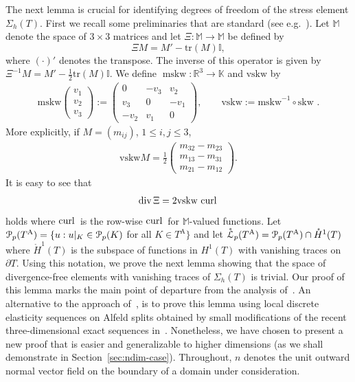 \documentclass[12pt]{amsart}
\numberwithin{equation}{section}
\theoremstyle{definition}
\theoremstyle{remark}
\newcommand{\M}{\mathbb{M}}
\newcommand{\K}{\mathbb{K}}
\renewcommand{\(}{\bigl(}
\renewcommand{\)}{\bigr)}
\newcommand{\curl}{{\ensuremath\mathop{\mathrm{curl}\,}}}
\newcommand{\grad}{{\ensuremath\mathop{\mathrm{ grad}\,}}}
\newcommand{\dive}{{\ensuremath\mathop{\mathrm{div}\,}}} %
\newcommand{\pol}{\EuScript{P}}
\newcommand{\Ta}{T^{\text{A}}}
\newcommand{\LLo}{\mathring{\mathcal{L}}}
\newcommand\mskw{\operatorname{mskw}}
\newcommand{\revj}[1]{{\color{black}#1}}
\begin{document}
The next lemma is crucial for identifying degrees of freedom of the stress element  $\Sigma_h(T)$. First we recall some preliminaries that are standard (see e.g.\ \cite{arnold2008finite}). Let $\M$ denote the space of $3\times 3$
matrices and let $\Xi : \M \to \M$ be defined by 
\begin{equation}
  \label{eq:Xi-defn}
  \Xi M=M' -\text{tr}(M) \mathbb{I},
\end{equation}
where $(\cdot)'$ denotes the transpose. The inverse of this operator is given by 
$\Xi^{-1} M=M'-\frac{1}{2}\text{tr}(M) \mathbb{I}.
$
We define  $\mskw : \mathbb{R}^3 \to \K$ and $\text{vskw}$ by
\begin{align*}
 \text{mskw} \begin{pmatrix}
v_1 \\
v_2 \\
v_3
\end{pmatrix}
 :=
  \begin{pmatrix}
0  &  -v_3 & v_2 \\
v_3 & 0 & -v_1 \\
-v_2& v_1 & 0 
\end{pmatrix}, \qquad \text{vskw}:= \text{mskw}^{-1} \circ \text{skw }.
\end{align*}
\revj{ More explicitly, if $M=(m_{ij})$, $1\le i,j\le 3$, 
\begin{align*}
\text{vskw} M= \frac{1}{2} \begin{pmatrix}
m_{32}-m_{23} \\
 m_{13}-m_{31}\\
m_{21}-m_{12}
\end{pmatrix}.
\end{align*}
} 
It is easy to see that 
\begin{gather}
\label{alg1-1}
  \dive \Xi= 2\text{vskw } \curl
\end{gather}
holds \revj{where $\curl$ is the row-wise $\curl$ for $\M$-valued functions}.
Let $\pol_p(\Ta) = \{ u: u|_K \in \pol_p(K)$ for all
$K \in \Ta\}$ and let $\LLo_p(\Ta) = \pol_p(\Ta) \cap \mathring{H}^1(T)$ \revj{where $\mathring{H}^1(T)$ is the subspace of functions in $H^1(T)$ with vanishing traces on $\partial T$}.
Using this notation, we prove the next lemma showing that the space
of divergence-free elements with vanishing traces of $\Sigma_h(T)$ is
trivial. Our proof of this lemma  marks the main point of departure from the analysis of~\cite{Krizek1982}. An alternative to  the approach of~\cite{Krizek1982}, 
is to prove this lemma using local discrete elasticity sequences
on Alfeld splits obtained by small modifications of the recent 
three-dimensional exact sequences
in~\cite{christiansen2020discrete}. Nonetheless,  we have chosen to present
a new proof that is easier and generalizable to higher dimensions
(as we shall  demonstrate in Section~\ref{sec:ndim-case}).
Throughout,  $n$ denotes the unit outward normal vector field on the boundary of a  domain under consideration.
\end{document}
